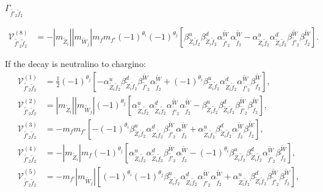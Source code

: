 \documentclass[final,3p,times,pdflatex]{elsarticle}
\begin{document}
\textbf{\underline{$\Gamma_{\tilde{f'}_2 \tilde{f}_2}$}}


\begin{align}
\mathcal{V}_{\tilde{f'}_2 \tilde{f}_2}^{(8)} &= -|m_{\tilde{Z}_i}||m_{\tilde{W}_j}|m_{f} m_{f'} (-1)^{\theta_i} (-1)^{\theta_j} \left[\beta_{\tilde{Z}_i \tilde{f}_2}^{u}\beta_{\tilde{Z}_i \tilde{f}_2}^{d} \alpha_{\tilde{f'}_2}^{\tilde{W}} \alpha_{\tilde{f}_2}^{\tilde{W}} - \alpha_{\tilde{Z}_i \tilde{f}_2}^{u} \alpha_{\tilde{Z}_i \tilde{f}_2}^{d} \beta_{\tilde{f'}_2}^{\tilde{W}} \beta_{\tilde{f}_2}^{\tilde{W}}\right].
\end{align}

If the decay is neutralino to chargino:
\begin{align}
\mathcal{V}_{\tilde{f'}_2 \tilde{f}_2}^{(1)} &= \frac{1}{2}(-1)^{\theta_j}\left[-\alpha_{\tilde{Z}_i \tilde{f}_2}^{u} \beta_{\tilde{Z}_i \tilde{f}_2}^{d} \beta_{\tilde{f'}_2}^{\tilde{W}}\alpha_{\tilde{f}_2}^{\tilde{W}} + (-1)^{\theta_i}\beta_{\tilde{Z}_i \tilde{f}_2}^{u} \alpha_{\tilde{Z}_i \tilde{f}_2}^{d} \alpha_{\tilde{f'}_2}^{\tilde{W}} \beta_{\tilde{f}_2}^{\tilde{W}}\right], \\
\mathcal{V}_{\tilde{f'}_2 \tilde{f}_2}^{(2)} &= |m_{\tilde{Z}_i}||m_{\tilde{W}_j}|(-1)^{\theta_j}\left[\alpha_{\tilde{Z}_i \tilde{f}_2}^{u} \alpha_{\tilde{Z}_i \tilde{f}_2}^{d} \alpha_{\tilde{f'}_2}^{\tilde{W}} \alpha_{\tilde{f}_2}^{\tilde{W}} - \beta_{\tilde{Z}_i \tilde{f}_2}^{u} \beta_{\tilde{Z}_{i} \tilde{f}_2}^{d} \beta_{\tilde{f'}_2}^{\tilde{W}} \beta_{\tilde{f}_2}^{\tilde{W}}\right], \\
\mathcal{V}_{\tilde{f'}_2 \tilde{f}_2}^{(3)} &= -m_{f}m_{f'}\left[-(-1)^{\theta_i}\beta_{\tilde{Z}_i \tilde{f}_2}^{u} \alpha_{\tilde{Z}_i \tilde{f}_2}^{d} \beta_{\tilde{f'}_2}^{\tilde{W}} \alpha_{\tilde{f}_2}^{\tilde{W}} +  \alpha_{\tilde{Z}_i \tilde{f}_2}^{u} \beta_{\tilde{Z}_i \tilde{f}_2}^{d} \alpha_{\tilde{f}_2}^{\tilde{W}} \beta_{\tilde{f}_2}^{\tilde{W}}\right], \\
\mathcal{V}_{\tilde{f'}_2 \tilde{f}_2}^{(4)} &=-|m_{\tilde{Z}_i}|m_{f}(-1)^{\theta_j}\left[\alpha_{\tilde{Z}_i \tilde{f}_2}^{u} \alpha_{\tilde{Z}_i \tilde{f}_2}^{d} \beta_{\tilde{f'}_2}^{\tilde{W}}\alpha_{\tilde{f}_2}^{\tilde{W}} - (-1)^{\theta_i} \beta_{\tilde{Z}_i \tilde{f}_2}^{u} \beta_{\tilde{Z}_i \tilde{f}_2}^{d} \alpha_{\tilde{f'}_2}^{\tilde{W}} \beta_{\tilde{f}_2}^{\tilde{W}}\right], \\
\mathcal{V}_{\tilde{f'}_2 \tilde{f}_2}^{(5)} &= -m_{f'} |m_{\tilde{W}_j}|\left[(-1)^{\theta_i}(-1)^{\theta_j} \beta_{\tilde{Z}_i \tilde{f}_2}^{u} \alpha_{\tilde{Z}_i \tilde{f}_2}^{d} \alpha_{\tilde{f'}_2}^{\tilde{W}} \alpha_{\tilde{f}_2}^{\tilde{W}} + \alpha_{\tilde{Z}_i \tilde{f}_2}^{u} \beta_{\tilde{Z}_i \tilde{f}_2}^{d} \beta_{\tilde{f'}_2}^{\tilde{W}} \beta_{\tilde{f}_2}^{\tilde{W}}\right], \\

\end{align}
\end{document}
